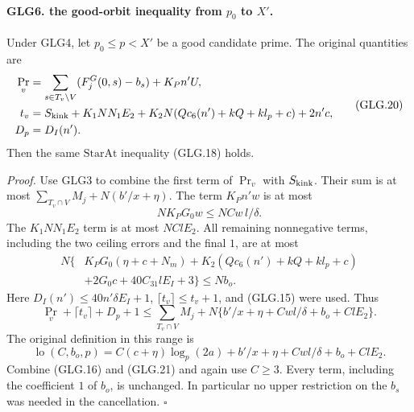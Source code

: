 \documentclass[11pt,a4paper]{article}
\numberwithin{equation}{section}
\theoremstyle{remark}\newtheorem{remark}[theorem]{Remark}
\begin{document}
\paragraph{GLG6. the good-orbit inequality from \(p_0\) to \(X'\).}
\label{claim:GLG6}
Under GLG4, let \(p_0\le p<X'\) be a good candidate prime.
The original quantities are
\[
 \begin{split}
 \Pr_v&=\sum_{s\in T_v\setminus V}(F_j^G(0,s)-b_s)+K_Pn'U,\\
 t_v&=S_{\rm kink}+K_1NN_1E_2
            +K_2N(Qc_6(n')+kQ+kl_p+c)+2n'c,\\
 D_p&=D_I(n').
 \end{split}                                                       \tag{GLG.20}
\]
Then the same \(\mathrm{StarAt}\) inequality (GLG.18) holds.

\emph{Proof.}
Use GLG3 to combine the first term of \(\Pr_v\) with
\(S_{\rm kink}\). Their sum is at most
\(\sum_{T_v\cap V}M_j+N(b'/x+\eta)\).
The term \(K_Pn'w\) is at most
\[
 NK_PG_0w\le NCw\,l/\delta.
 \]
The \(K_1NN_1E_2\) term is at most \(NClE_2\).
All remaining nonnegative terms, including the two ceiling
errors and the final \(1\), are at most
\[
 \begin{split}
 N\{&K_PG_0(\eta+c+N_m)
       +K_2(Qc_6(n')+kQ+kl_p+c)\\
       &+2G_0c+40C_{31}lE_I+3\}\le Nb_o.
 \end{split}
 \]
Here \(D_I(n')\le40n'\delta E_I+1\),
\(\lceil t_v\rceil\le t_v+1\), and (GLG.15) were used.
Thus
\[
 \Pr_v+\lceil t_v\rceil+D_p+1
 \le \sum_{T_v\cap V}M_j
       +N\{b'/x+\eta+Cwl/\delta+b_o+ClE_2\}.                      \tag{GLG.21}
\]
The original definition in this range is
\[
 \operatorname{lo}(C,b_o,p)
   =C(c+\eta)\log_p(2a)+b'/x+\eta+Cwl/\delta+b_o+ClE_2 .
 \]
Combine (GLG.16) and (GLG.21) and again use \(C\ge3\).
Every term, including the coefficient \(1\) of \(b_o\), is
unchanged. In particular no upper restriction on the \(b_s\)
was needed in the cancellation.
\hfill\(\square\)

\end{document}
